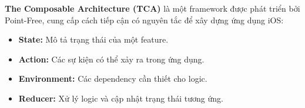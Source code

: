 \textbf{The Composable Architecture (TCA)} là một framework được phát triển bởi Point-Free, cung cấp cách tiếp cận có nguyên tắc để xây dựng ứng dụng iOS:

\begin{itemize}
  \item \textbf{State:} Mô tả trạng thái của một feature.
  \item \textbf{Action:} Các sự kiện có thể xảy ra trong ứng dụng.
  \item \textbf{Environment:} Các dependency cần thiết cho logic.
  \item \textbf{Reducer:} Xử lý logic và cập nhật trạng thái tương ứng.
\end{itemize}
